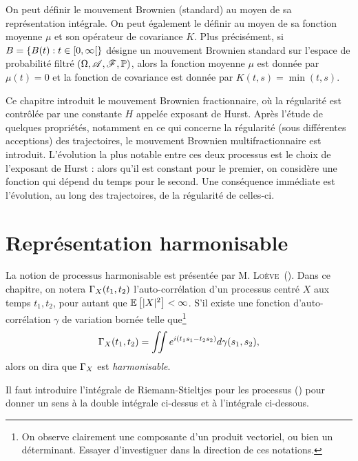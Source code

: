 \label{chp:fbm-mbm}

On peut définir le mouvement Brownien (standard) au moyen de sa
représentation intégrale. On peut également le définir au moyen de sa
fonction moyenne $\mu$ et son opérateur de covariance $K$. Plus
précisément, si $B = \{B(t) : t \in \left[0,\infty\right[\}$ désigne un
mouvement Brownien standard sur l'espace de probabilité filtré
$\left(\Omega, \mathscr{A}, \mathscr{F}, \mathbb{P}\right)$, alors la fonction moyenne $\mu$
est donnée par $\mu(t) = 0$ et la fonction de covariance est donnée
par $K(t,s) = \min(t,s)$.

Ce chapitre introduit le mouvement Brownien fractionnaire, où la
régularité est contrôlée par une constante $H$ appelée exposant de
Hurst. Après l'étude de quelques propriétés, notamment en ce qui
concerne la régularité (sous différentes acceptions) des trajectoires,
le mouvement Brownien multifractionnaire est introduit. L'évolution la
plus notable entre ces deux processus est le choix de l'exposant de
Hurst : alors qu'il est constant pour le premier, on considère une
fonction qui dépend du temps pour le second. Une conséquence immédiate
est l'évolution, au long des trajectoires, de la régularité de
celles-ci.

\section{Représentation harmonisable}
La notion de processus harmonisable est présentée par
M. \textsc{Loève}~(\cite{loeve1978}). Dans ce chapitre, on notera
$\Gamma_X(t_1,t_2)$ l'auto-corrélation d'un processus centré $X$ aux
temps $t_1, t_2$, pour autant que $\mathbb{E}\left[|X|^2\right] < \infty$. S'il existe
une fonction d'auto-corrélation $\gamma$ de variation bornée telle
que\footnote{On observe clairement une composante d'un produit
  vectoriel, ou bien un déterminant. Essayer d'investiguer dans la
  direction de ces notations.}
\[ \Gamma_X(t_1,t_2) = \iint e^{i(t_1s_1 - t_2s_2)} d\gamma(s_1,s_2)
  ,\] alors on dira que $\Gamma_X$ est \emph{harmonisable}.

\begin{prerequis}
  Il faut introduire l'intégrale de Riemann-Stieltjes pour les
  processus (\cite[p.~138]{loeve1978}) pour donner un sens à la double
  intégrale ci-dessus et à l'intégrale ci-dessous.
\end{prerequis}


